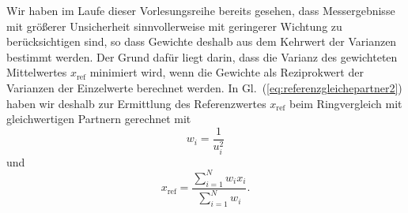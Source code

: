 Wir haben im Laufe dieser Vorlesungsreihe bereits gesehen, dass
Messergebnisse mit größerer Unsicherheit sinnvollerweise mit geringerer
Wichtung zu berücksichtigen sind, so dass Gewichte
deshalb aus dem Kehrwert der Varianzen bestimmt werden. Der Grund dafür liegt darin,
dass die Varianz des gewichteten Mittelwertes $x_\mathrm{ref}$ minimiert wird,
wenn die Gewichte als Reziprokwert der Varianzen der Einzelwerte berechnet werden.
In Gl.~(\ref{eq:referenzgleichepartner2}) 
haben wir deshalb zur Ermittlung des Referenzwertes $x_\mathrm{ref}$ beim
Ringvergleich mit gleichwertigen Partnern gerechnet mit
\begin{equation*}
    w_i = \frac{1}{u^2_i}
\end{equation*}
und
\begin{equation*}
 x_\mathrm{ref} = \frac{\sum\limits_{i=1}^N w_i x_i}{\sum\limits_{i=1}^N w_i} .
\end{equation*}

